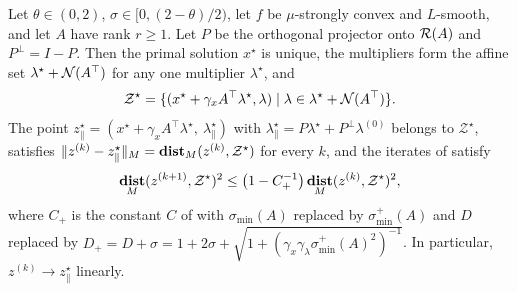 \documentclass[11pt]{article}
\begin{document}
\begin{proposition}\label{prop:linear-rate-rank-deficient}
    Let $\theta \in (0, 2)$, $\sigma \in [0, (2-\theta)/2)$, let $f$ be $\mu$-strongly convex and $L$-smooth, and let $A$ have rank $r \geq 1$.
    Let $P$ be the orthogonal projector onto ${\mathcal R}(A)$ and $P^\perp = I - P$.
    Then the primal solution $x^\star$ is unique, the multipliers form the affine set $\lambda^\star + {\mathcal N}(A^\top)$ for any one multiplier $\lambda^\star$, and
    \begin{equation*}
        \mathcal{Z}^\star = \{ (x^\star + \gamma_x A^\top\lambda^\star, \lambda) \mid \lambda \in \lambda^\star + {\mathcal N}(A^\top) \}.
    \end{equation*}
    The point $z^\star_\parallel = (x^\star + \gamma_x A^\top\lambda^\star,\ \lambda^\star_\parallel)$ with $\lambda^\star_\parallel = P\lambda^\star + P^\perp\lambda^{(0)}$ belongs to $\mathcal{Z}^\star$, satisfies $\|z^{(k)} - z^\star_\parallel\|_M = \mathop{\bf dist{}}_M(z^{(k)}, \mathcal{Z}^\star)$ for every $k$, and the iterates of  satisfy
    \begin{equation}\label{eq:linear-rate-rank-deficient}
        \mathop{\bf dist{}}_M(z^{(k+1)}, \mathcal{Z}^\star)^2 \leq \left(1 - C_+^{-1}\right)\mathop{\bf dist{}}_M(z^{(k)}, \mathcal{Z}^\star)^2,
    \end{equation}
    where $C_+$ is the constant $C$ of  with $\sigma_{\min}(A)$ replaced by $\sigma_{\min}^+(A)$ and $D$ replaced by $D_+ = D + \sigma = 1 + 2\sigma + \sqrt{1 + (\gamma_x\gamma_\lambda\sigma_{\min}^+(A)^2)^{-1}}$.
    In particular, $z^{(k)} \to z^\star_\parallel$ linearly.
\end{proposition}
\end{document}
